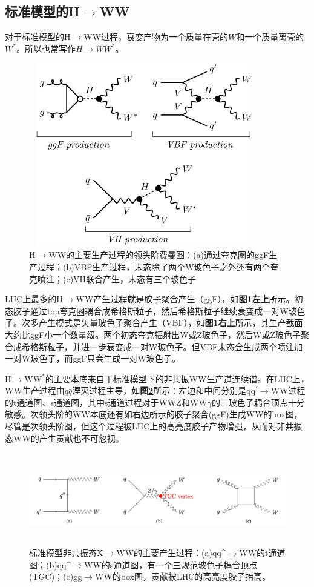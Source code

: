 \subsection{标准模型的H$\to$WW}
对于标准模型的H$\to$WW过程，衰变产物为一个质量在壳的$W$和一个质量离壳的$W^*$。所以也常写作$H\to WW^*$。
\begin{figure}[H]
 \centering
 \includegraphics[height=8cm, width=10cm]{pictures/HWW_production.png}
  \caption{H$\to$WW的主要生产过程的领头阶费曼图：(a)通过夸克圈的ggF生产过程；(b)VBF生产过程，末态除了两个W玻色子之外还有两个夸克喷注；(c)VH联合产生，末态有三个玻色子}
 \label{fig:2.4}
\end{figure}
LHC上最多的H$\to$WW产生过程就是胶子聚合产生（ggF），如\textbf{图\ref{fig:2.4}左上}所示。初态胶子通过top夸克圈耦合成希格斯粒子，然后希格斯粒子继续衰变成一对W玻色子。次多产生模式是矢量玻色子聚合产生（VBF），如\textbf{图\ref{fig:2.4}右上}所示，其生产截面大约比ggF小一个数量级。两个初态夸克辐射出W或Z玻色子，然后W或Z玻色子聚合成希格斯粒子，并进一步衰变成一对W玻色子。但VBF末态会生成两个喷注加一对W玻色子，而ggF只会生成一对W玻色子。

H$\to\text{WW}^*$的主要本底来自于标准模型下的非共振WW生产道连续谱。在LHC上，WW生产过程由$q\bar{q}$湮灭过程主导\cite{john-alison}，如\textbf{图\ref{fig:2.5}}所示：左边和中间分别是$\text{qq}^\prime\to$WW过程的t通道图、s通道图，其中s通道过程对于WWZ和WW$\gamma$的三玻色子耦合顶点十分敏感。次领头阶的WW本底还有如右边所示的胶子聚合(ggF)生成WW的box图，尽管是次领头阶图，但这个过程被LHC上的高亮度胶子产物增强，从而对非共振态WW的产生贡献也不可忽视。
\begin{figure}[H]
 \centering
 \includegraphics[height=4cm, width=16cm]{pictures/WW_bkg.png}
  \caption{标准模型非共振态X$\to$WW的主要产生过程\cite{john-alison}：(a)qq^\prime$\to$WW的t通道图；(b)qq^\prime$\to$WW的s通道图，有一个三规范玻色子耦合顶点(TGC)；(c)gg$\to$WW的box图，贡献被LHC的高亮度胶子抬高。}
 \label{fig:2.5}
\end{figure}

